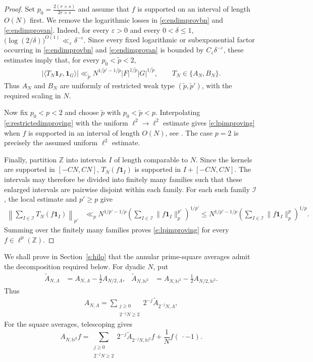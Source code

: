 \documentclass[12pt,reqno]{amsart}
\numberwithin{equation}{section}
\theoremstyle{definition}
\theoremstyle{remark}
\begin{document}
\begin{proof}
Set $p_0=\frac{2(r+s)}{2r+s}$ and assume that $f$ is supported on an interval of length $O(N)$ first. 
We  remove the logarithmic losses in
\eqref{e:endimprovbn} and \eqref{e:endimprovan}.  Indeed, for every
$\varepsilon>0$ and every $0<\delta\leq1$, $ \bigl(\log(2/\delta)\bigr)^{O(1)}
 \ll_\varepsilon \delta^{-\varepsilon}.$
 Since every fixed logarithmic or
subexponential factor occurring in \eqref{e:endimprovbn} and
\eqref{e:endimprovan} is bounded by $C_\varepsilon\delta^{-\varepsilon}$,
these estimates imply that, for every $p_0<\widetilde p<2$,
\begin{align}\label{e:restrictedimproving}
 |\langle T_N\mathbf1_F,\mathbf1_G\rangle|
 \ll_{\widetilde p}
 N^{1/\widetilde p'-1/\widetilde p}
 |F|^{1/\widetilde p}|G|^{1/\widetilde p},
 \qquad T_N\in\{A_N,B_N\}.
\end{align}
Thus $A_N$ and $B_N$ are uniformly of restricted weak type
$(\widetilde p,\widetilde p')$, with the required scaling in $N$.

Now fix $p_0<p<2$ and choose $\widetilde p$ with
$p_0<\widetilde p<p$. Interpolating \eqref{e:restrictedimproving} with the uniform
$\ell^2\to\ell^2$ estimate gives \eqref{e:lpimproving} when $f$ is
supported in an interval of length $O(N)$, see \cite[Chapter 1]{BB}.  The case $p=2$
is precisely the assumed uniform $\ell^2$ estimate.

Finally, partition $\mathbb Z$ into intervals $I$ of length comparable
to $N$.  Since the kernels are supported in $[-CN,CN]$,
$T_N(f\mathbf1_I)$ is supported in $I+[-CN,CN]$.  The intervals may
therefore be divided into finitely many families such that these
enlarged intervals are pairwise disjoint within each family.  For each
such family $\mathcal I$, the local estimate and $p'\geq p$ give
\begin{align*}
 \left\|\sum_{I\in\mathcal I}T_N(f\mathbf1_I)\right\|_{p'}
 &\ll_p N^{1/p'-1/p}
 \left(\sum_{I\in\mathcal I}\|f\mathbf1_I\|_p^{p'}\right)^{1/p'}\leq N^{1/p'-1/p}
 \left(\sum_{I\in\mathcal I}\|f\mathbf1_I\|_p^p\right)^{1/p}.
\end{align*}
Summing over the finitely many families proves
\eqref{e:lpimproving} for every $f\in\ell^p(\mathbb Z)$.
\end{proof}

We shall prove in Section~\ref{s:hilo} that the annular prime-square
averages admit the decomposition required below.  For dyadic $N$, put
\begin{align}\label{e:annularaverages}
 \widetilde A_{N,\Lambda}
 &=A_{N,\Lambda}-\frac12A_{N/2,\Lambda},&
 \widetilde A_{N,\mathbb N^2}
 &=A_{N,\mathbb N^2}-\frac12A_{N/2,\mathbb N^2}.
\end{align}
Thus
\begin{align}\label{e:annularreconstruction}
 A_{N,\Lambda}
 =\sum_{\substack{j\geq0\\2^{-j}N\geq2}}
 2^{-j}\widetilde A_{2^{-j}N,\Lambda},
\end{align}
For the square averages, telescoping gives
\[
 A_{N,\mathbb N^2}f
 =
 \sum_{\substack{j\geq0\\2^{-j}N\geq2}}
 2^{-j}\widetilde A_{2^{-j}N,\mathbb N^2}f
 +\frac1N f(\,\cdot-1).
\]
\end{document}
